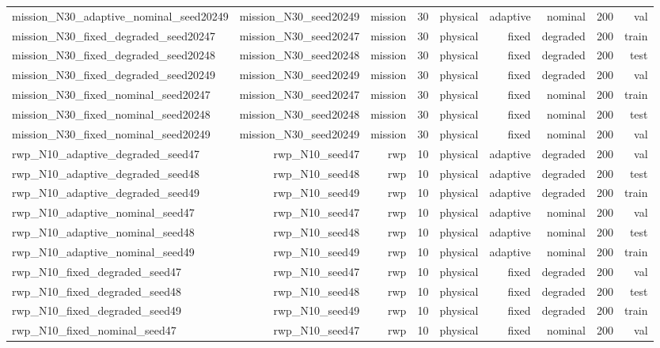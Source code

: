 \begin{tabular}{lrrrrrrrr}
mission\_N30\_adaptive\_nominal\_seed20249 & mission\_N30\_seed20249 & mission & 30 & physical & adaptive & nominal & 200 & val \\
mission\_N30\_fixed\_degraded\_seed20247 & mission\_N30\_seed20247 & mission & 30 & physical & fixed & degraded & 200 & train \\
mission\_N30\_fixed\_degraded\_seed20248 & mission\_N30\_seed20248 & mission & 30 & physical & fixed & degraded & 200 & test \\
mission\_N30\_fixed\_degraded\_seed20249 & mission\_N30\_seed20249 & mission & 30 & physical & fixed & degraded & 200 & val \\
mission\_N30\_fixed\_nominal\_seed20247 & mission\_N30\_seed20247 & mission & 30 & physical & fixed & nominal & 200 & train \\
mission\_N30\_fixed\_nominal\_seed20248 & mission\_N30\_seed20248 & mission & 30 & physical & fixed & nominal & 200 & test \\
mission\_N30\_fixed\_nominal\_seed20249 & mission\_N30\_seed20249 & mission & 30 & physical & fixed & nominal & 200 & val \\
rwp\_N10\_adaptive\_degraded\_seed47 & rwp\_N10\_seed47 & rwp & 10 & physical & adaptive & degraded & 200 & val \\
rwp\_N10\_adaptive\_degraded\_seed48 & rwp\_N10\_seed48 & rwp & 10 & physical & adaptive & degraded & 200 & test \\
rwp\_N10\_adaptive\_degraded\_seed49 & rwp\_N10\_seed49 & rwp & 10 & physical & adaptive & degraded & 200 & train \\
rwp\_N10\_adaptive\_nominal\_seed47 & rwp\_N10\_seed47 & rwp & 10 & physical & adaptive & nominal & 200 & val \\
rwp\_N10\_adaptive\_nominal\_seed48 & rwp\_N10\_seed48 & rwp & 10 & physical & adaptive & nominal & 200 & test \\
rwp\_N10\_adaptive\_nominal\_seed49 & rwp\_N10\_seed49 & rwp & 10 & physical & adaptive & nominal & 200 & train \\
rwp\_N10\_fixed\_degraded\_seed47 & rwp\_N10\_seed47 & rwp & 10 & physical & fixed & degraded & 200 & val \\
rwp\_N10\_fixed\_degraded\_seed48 & rwp\_N10\_seed48 & rwp & 10 & physical & fixed & degraded & 200 & test \\
rwp\_N10\_fixed\_degraded\_seed49 & rwp\_N10\_seed49 & rwp & 10 & physical & fixed & degraded & 200 & train \\
rwp\_N10\_fixed\_nominal\_seed47 & rwp\_N10\_seed47 & rwp & 10 & physical & fixed & nominal & 200 & val \\

\end{tabular}
